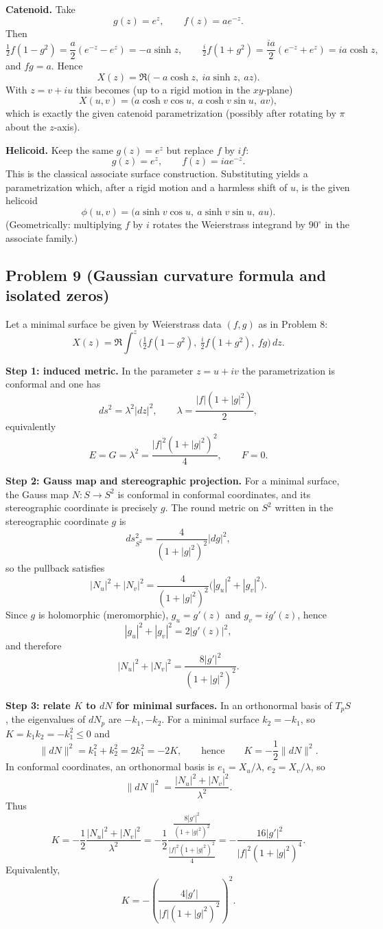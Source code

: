 \documentclass[12pt,a4paper]{article}
\theoremstyle{plain}
\theoremstyle{definition}      %
\begin{document}
	\medskip
	\textbf{Catenoid.}
	Take
	\[
	g(z)=e^{z},\qquad f(z)=a e^{-z}.
	\]
	Then
	\[
	\tfrac12 f(1-g^2)=\frac{a}{2}(e^{-z}-e^{z})=-a\sinh z,\qquad
	\tfrac{i}{2}f(1+g^2)=\frac{ia}{2}(e^{-z}+e^{z})=i a\cosh z,
	\]
	and $fg=a$. Hence
	\[
	X(z)=\Re\bigl(-a\cosh z,\ i a\sinh z,\ a z\bigr).
	\]
	With $z=v+iu$ this becomes (up to a rigid motion in the $xy$-plane)
	\[
	X(u,v)=\bigl(a\cosh v\cos u,\ a\cosh v\sin u,\ a v\bigr),
	\]
	which is exactly the given catenoid parametrization (possibly after rotating by $\pi$ about the $z$-axis).
	
	\medskip
	\textbf{Helicoid.}
	Keep the same $g(z)=e^{z}$ but replace $f$ by $if$:
	\[
	g(z)=e^{z},\qquad f(z)= i a e^{-z}.
	\]
	This is the classical associate surface construction. Substituting yields a parametrization which, after a rigid motion
	and a harmless shift of $u$, is the given helicoid
	\[
	\phi(u,v)=\bigl(a\sinh v\cos u,\ a\sinh v\sin u,\ a u\bigr).
	\]
	(Geometrically: multiplying $f$ by $i$ rotates the Weierstrass integrand by $90^\circ$ in the associate family.)
	
	\bigskip
	\subsection*{Problem 9 (Gaussian curvature formula and isolated zeros)}
	Let a minimal surface be given by Weierstrass data $(f,g)$ as in Problem 8:
	\[
	X(z)=\Re\int^z \Big(\tfrac12 f(1-g^2),\ \tfrac{i}{2}f(1+g^2),\ fg\Big)\,dz.
	\]
	
	\medskip
	\textbf{Step 1: induced metric.}
	In the parameter $z=u+iv$ the parametrization is conformal and one has
	\[
	ds^2=\lambda^2|dz|^2,\qquad 
	\lambda=\frac{|f|(1+|g|^2)}{2},
	\]
	equivalently
	\[
	E=G=\lambda^2=\frac{|f|^2(1+|g|^2)^2}{4},\qquad F=0.
	\]
	
	\medskip
	\textbf{Step 2: Gauss map and stereographic projection.}
	For a minimal surface, the Gauss map $N:S\to S^2$ is conformal in conformal coordinates, and its stereographic
	coordinate is precisely $g$. The round metric on $S^2$ written in the stereographic coordinate $g$ is
	\[
	ds^2_{S^2}=\frac{4}{(1+|g|^2)^2}|dg|^2,
	\]
	so the pullback satisfies
	\[
	|N_u|^2+|N_v|^2=\frac{4}{(1+|g|^2)^2}\bigl(|g_u|^2+|g_v|^2\bigr).
	\]
	Since $g$ is holomorphic (meromorphic), $g_u=g'(z)$ and $g_v=i g'(z)$, hence
	\[
	|g_u|^2+|g_v|^2=2|g'(z)|^2,
	\]
	and therefore
	\[
	|N_u|^2+|N_v|^2=\frac{8|g'|^2}{(1+|g|^2)^2}.
	\]
	
	\medskip
	\textbf{Step 3: relate $K$ to $dN$ for minimal surfaces.}
	In an orthonormal basis of $T_pS$, the eigenvalues of $dN_p$ are $-k_1,-k_2$.
	For a minimal surface $k_2=-k_1$, so $K=k_1k_2=-k_1^2\le 0$ and
	\[
	\|dN\|^2=k_1^2+k_2^2=2k_1^2=-2K,
	\qquad\text{hence}\qquad
	K=-\frac12\|dN\|^2.
	\]
	In conformal coordinates, an orthonormal basis is $e_1=X_u/\lambda$, $e_2=X_v/\lambda$, so
	\[
	\|dN\|^2=\frac{|N_u|^2+|N_v|^2}{\lambda^2}.
	\]
	Thus
	\[
	K=-\frac12\frac{|N_u|^2+|N_v|^2}{\lambda^2}
	=-\frac12\frac{\frac{8|g'|^2}{(1+|g|^2)^2}}{\frac{|f|^2(1+|g|^2)^2}{4}}
	=-\frac{16|g'|^2}{|f|^2(1+|g|^2)^4}.
	\]
	Equivalently,
	\[
	K=-\left(\frac{4|g'|}{|f|(1+|g|^2)^2}\right)^2.
	\]
	
\end{document}
